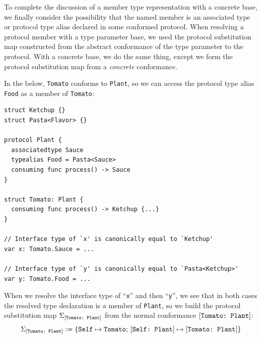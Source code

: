 \documentclass[../generics]{subfiles}
\begin{document}
\smallskip

To complete the discussion of a member type representation with a concrete base, we finally consider the possibility that the named member is an associated type or protocol type alias declared in some conformed protocol. When resolving a protocol member with a type parameter base, we used the protocol substitution map constructed from the abstract conformance of the type parameter to the protocol. With a concrete base, we do the same thing, except we form the protocol substitution map from a \emph{concrete} conformance.

In the below, \texttt{Tomato} conforms to \texttt{Plant}, so we can access the protocol type alias \texttt{Food} as a member of \texttt{Tomato}:
\begin{Verbatim}
struct Ketchup {}
struct Pasta<Flavor> {}

protocol Plant {
  associatedtype Sauce
  typealias Food = Pasta<Sauce>
  consuming func process() -> Sauce
}

struct Tomato: Plant {
  consuming func process() -> Ketchup {...}
}

// Interface type of `x' is canonically equal to `Ketchup'
var x: Tomato.Sauce = ...

// Interface type of `y' is canonically equal to `Pasta<Ketchup>'
var y: Tomato.Food = ...
\end{Verbatim}
When we resolve the interface type of ``\texttt{x}'' and then ``\texttt{y}'', we see that in both cases the resolved type declaration is a member of \texttt{Plant}, so we build the protocol substitution map $\Sigma_{[\texttt{Tomato:~Plant}]}$ from the normal conformance $[\texttt{Tomato:~Plant}]$:
\[\Sigma_{[\texttt{Tomato:~Plant}]} := \{\texttt{Self} \mapsto \texttt{Tomato};\,[\texttt{Self:~Plant}] \mapsto [\texttt{Tomato:~Plant}]\}\]
\end{document}
